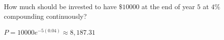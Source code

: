 \begin{example}
    How much should be invested to have \(\$10000\) at the end of year \(5\) at \(4\%\) compounding continuously?
    \begin{solution}
        \(P = 10000e^{-5\left(0.04\right)} \approx 8,187.31\)
    \end{solution}
\end{example}